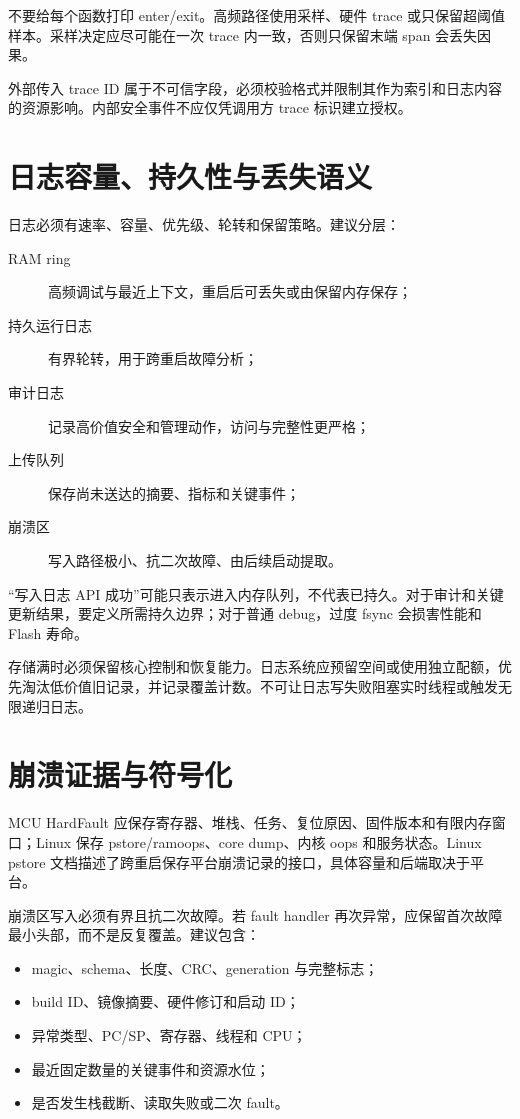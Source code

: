 不要给每个函数打印 enter/exit。高频路径使用采样、硬件 trace 或只保留超阈值样本。采样决定应尽可能在一次 trace 内一致，否则只保留末端 span 会丢失因果。

外部传入 trace ID 属于不可信字段，必须校验格式并限制其作为索引和日志内容的资源影响。内部安全事件不应仅凭调用方 trace 标识建立授权。

\section{日志容量、持久性与丢失语义}

日志必须有速率、容量、优先级、轮转和保留策略。建议分层：

\begin{description}
  \item[RAM ring] 高频调试与最近上下文，重启后可丢失或由保留内存保存；
  \item[持久运行日志] 有界轮转，用于跨重启故障分析；
  \item[审计日志] 记录高价值安全和管理动作，访问与完整性更严格；
  \item[上传队列] 保存尚未送达的摘要、指标和关键事件；
  \item[崩溃区] 写入路径极小、抗二次故障、由后续启动提取。
\end{description}

“写入日志 API 成功”可能只表示进入内存队列，不代表已持久。对于审计和关键更新结果，要定义所需持久边界；对于普通 debug，过度 fsync 会损害性能和 Flash 寿命。

存储满时必须保留核心控制和恢复能力。日志系统应预留空间或使用独立配额，优先淘汰低价值旧记录，并记录覆盖计数。不可让日志写失败阻塞实时线程或触发无限递归日志。

\section{崩溃证据与符号化}

MCU HardFault 应保存寄存器、堆栈、任务、复位原因、固件版本和有限内存窗口；Linux 保存 pstore/ramoops、core dump、内核 oops 和服务状态。Linux pstore 文档描述了跨重启保存平台崩溃记录的接口\cite{linux-pstore}，具体容量和后端取决于平台。

崩溃区写入必须有界且抗二次故障。若 fault handler 再次异常，应保留首次故障最小头部，而不是反复覆盖。建议包含：

\begin{itemize}
  \item magic、schema、长度、CRC、generation 与完整标志；
  \item build ID、镜像摘要、硬件修订和启动 ID；
  \item 异常类型、PC/SP、寄存器、线程和 CPU；
  \item 最近固定数量的关键事件和资源水位；
  \item 是否发生栈截断、读取失败或二次 fault。
\end{itemize}

